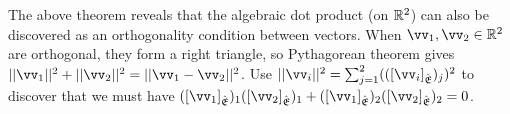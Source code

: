 \begin{remark}
    The above theorem reveals that the algebraic dot product (on $\mathbb{R}^2$) can also be discovered as an orthogonality condition between vectors. When $\vv_1, \vv_2 \in \R^2$ are orthogonal, they form a right triangle, so Pythagorean theorem gives $||\vv_1||^2 + ||\vv_2||^2 = ||\vv_1 - \vv_2||^2$. Use $||\vv_i||^2 = \sum_{j = 1}^2 (([\vv_i]_\sE)_j)^2$ to discover that we must have $([\vv_1]_\sE)_1 ([\vv_2]_\sE)_1 + ([\vv_1]_\sE)_2 ([\vv_2]_\sE)_2 = 0$.
\end{remark}

